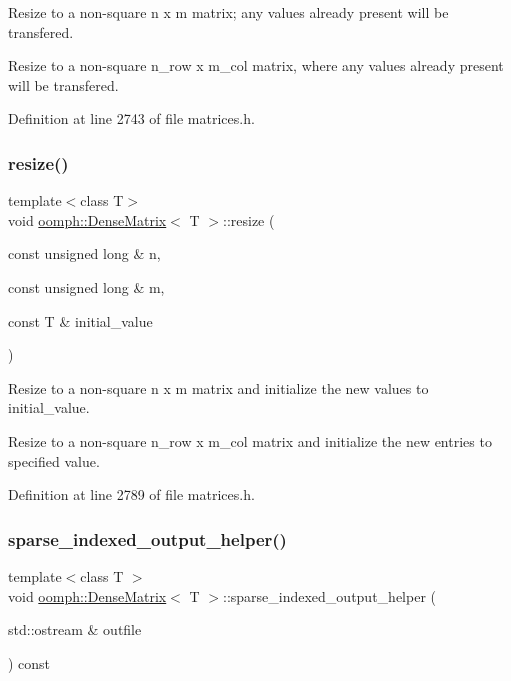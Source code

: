 Resize to a non-\/square n x m matrix; any values already present will be transfered. 

Resize to a non-\/square n\+\_\+row x m\+\_\+col matrix, where any values already present will be transfered. 

Definition at line 2743 of file matrices.\+h.

\mbox{\label{classoomph_1_1DenseMatrix_aeb6daf6539fee8d3d6f7a81306798b10}} 
\subsubsection{\texorpdfstring{resize()}{resize()}\hspace{0.1cm}{\footnotesize\ttfamily [3/3]}}
{\footnotesize\ttfamily template$<$class T$>$ \\
void \hyperlink{classoomph_1_1DenseMatrix}{oomph\+::\+Dense\+Matrix}$<$ T $>$\+::resize (\begin{DoxyParamCaption}\item[{const unsigned long \&}]{n,  }\item[{const unsigned long \&}]{m,  }\item[{const T \&}]{initial\+\_\+value }\end{DoxyParamCaption})}



Resize to a non-\/square n x m matrix and initialize the new values to initial\+\_\+value. 

Resize to a non-\/square n\+\_\+row x m\+\_\+col matrix and initialize the new entries to specified value. 

Definition at line 2789 of file matrices.\+h.

\mbox{\label{classoomph_1_1DenseMatrix_a6e9084acc11e036d4c5f7e5322d12034}} 
\subsubsection{\texorpdfstring{sparse\+\_\+indexed\+\_\+output\+\_\+helper()}{sparse\_indexed\_output\_helper()}}
{\footnotesize\ttfamily template$<$class T $>$ \\
void \hyperlink{classoomph_1_1DenseMatrix}{oomph\+::\+Dense\+Matrix}$<$ T $>$\+::sparse\+\_\+indexed\+\_\+output\+\_\+helper (\begin{DoxyParamCaption}\item[{std\+::ostream \&}]{outfile }\end{DoxyParamCaption}) const\hspace{0.3cm}{\ttfamily [virtual]}}



